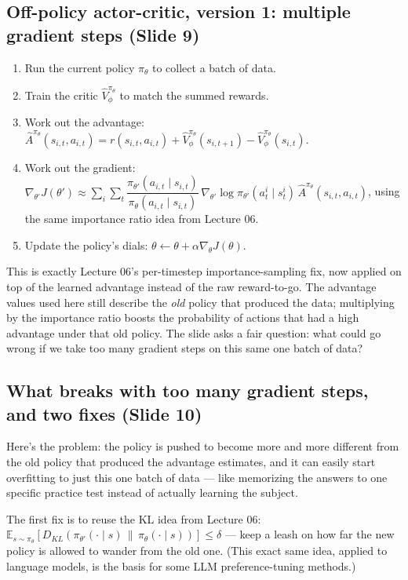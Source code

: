 \documentclass[11pt]{article}
\begin{document}
\subsection{Off-policy actor-critic, version 1: multiple gradient steps (Slide 9)}
\begin{enumerate}[leftmargin=*]
  \item Run the current policy $\pi_\theta$ to collect a batch of data.
  \item Train the critic $\hat V^{\pi_\theta}_\phi$ to match the summed rewards.
  \item Work out the advantage: $\hat A^{\pi_\theta}(s_{i,t},a_{i,t}) = r(s_{i,t},a_{i,t}) + \hat V^{\pi_\theta}_\phi(s_{i,t+1}) - \hat V^{\pi_\theta}_\phi(s_{i,t})$.
  \item Work out the gradient: $\nabla_{\theta'}J(\theta') \approx \sum_i\sum_t \dfrac{\pi_{\theta'}(a_{i,t}\mid s_{i,t})}{\pi_\theta(a_{i,t}\mid s_{i,t})}\,\nabla_{\theta'}\log\pi_{\theta'}(a^i_t\mid s^i_t)\,\hat A^{\pi_\theta}(s_{i,t},a_{i,t})$, using the same importance ratio idea from Lecture 06.
  \item Update the policy's dials: $\theta \leftarrow \theta + \alpha\nabla_\theta J(\theta)$.
\end{enumerate}
This is exactly Lecture 06's per-timestep importance-sampling fix, now applied on top of the learned advantage instead of the raw reward-to-go. The advantage values used here still describe the \emph{old} policy that produced the data; multiplying by the importance ratio boosts the probability of actions that had a high advantage under that old policy. The slide asks a fair question: what could go wrong if we take too many gradient steps on this same one batch of data?

\subsection{What breaks with too many gradient steps, and two fixes (Slide 10)}
Here's the problem: the policy is pushed to become more and more different from the old policy that produced the advantage estimates, and it can easily start overfitting to just this one batch of data --- like memorizing the answers to one specific practice test instead of actually learning the subject.

The first fix is to reuse the KL idea from Lecture 06: $\mathbb{E}_{s\sim\pi_\theta}[D_{KL}(\pi_{\theta'}(\cdot\mid s)\,\|\,\pi_\theta(\cdot\mid s))] \le \delta$ --- keep a leash on how far the new policy is allowed to wander from the old one. (This exact same idea, applied to language models, is the basis for some LLM preference-tuning methods.)
\end{document}

